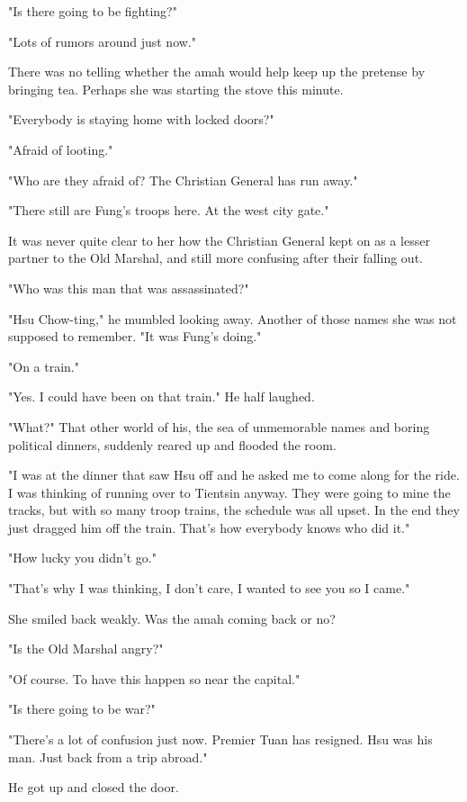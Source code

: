\par "Is there going to be fighting?"
\par "Lots of rumors around just now."
\par There was no telling whether the amah would help keep up the pretense by bringing tea. Perhaps she was starting the stove this minute.
\par "Everybody is staying home with locked doors?"
\par "Afraid of looting."
\par "Who are they afraid of? The Christian General has run away."
\par "There still are Fung's troops here. At the west city gate."
\par It was never quite clear to her how the Christian General kept on as a lesser partner to the Old Marshal, and still more confusing after their falling out.
\par "Who was this man that was assassinated?"
\par "Hsu Chow-ting," he mumbled looking away. Another of those names she was not supposed to remember. "It was Fung's doing."
\par "On a train."
\par "Yes. I could have been on that train." He half laughed.
\par "What?" That other world of his, the sea of unmemorable names and boring political dinners, suddenly reared up and flooded the room.
\par "I was at the dinner that saw Hsu off and he asked me to come along for the ride. I was thinking of running over to Tientsin anyway. They were going to mine the tracks, but with so many troop trains, the schedule was all upset. In the end they just dragged him off the train. That's how everybody knows who did it."
\par "How lucky you didn't go."
\par "That's why I was thinking, I don't care, I wanted to see you so I came."
\par She smiled back weakly. Was the amah coming back or no?
\par "Is the Old Marshal angry?"
\par "Of course. To have this happen so near the capital."
\par "Is there going to be war?"
\par "There's a lot of confusion just now. Premier Tuan has resigned. Hsu was his man. Just back from a trip abroad."
\par He got up and closed the door.
